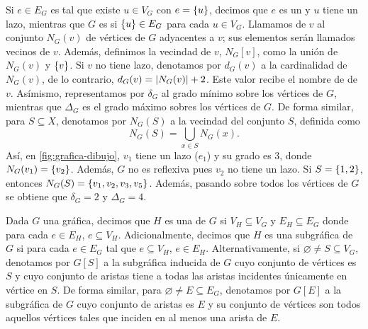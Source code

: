 Si $e\in E_G$ es tal que existe $u\in V_G$ con $e=\left\{ u\right\}$, decimos que $e$ es un
 y $u$ tiene un lazo, mientras que $G$ es
 si $\left\{ u\right\}\in E_G$ para cada $u\in V_G$.
Llamamos  de $v$ al conjunto $N_G(v)$ de v\'ertices de $G$
adyacentes a $v$; sus elementos ser\'an llamados vecinos de $v$. Adem\'as,
definimos la vecindad  de $v$, $N_G[v]$, como la
uni\'on de $N_G(v)$ y $\left\{ v\right\}$. Si $v$ no tiene lazo, denotamos por $d_G(v)$ a la
cardinalidad de $N_G(v)$, de lo contrario, $d_G(v) = \left|N_G(v)\right| + 2$. Este
valor recibe el nombre de  de $v$. As\'imismo, representamos por
$\delta_G$ al grado m\'inimo sobre los v\'ertices de $G$, mientras que
$\Delta_G$ es el grado m\'aximo sobres los v\'ertices de $G$. De forma similar,
para $S\subseteq X$, denotamos por $N_G(S)$ a la vecindad del conjunto $S$,
definida como
\[
  N_G(S) = \bigcup_{x\in S} N_G(x).
\]
As\'i, en \cref{fig:grafica-dibujo}, $v_1$ tiene un lazo ($e_1$) y su grado es
$3$, donde $N_G(v_1)=\left\{ v_2\right\}$. Adem\'as, $G$ no es reflexiva pues $v_2$ no tiene
un lazo. Si $S=\left\{ 1,2\right\}$, entonces $N_G(S)=\left\{ v_1,v_2,v_3,v_5\right\}$. Adem\'as,
pasando sobre todos los v\'ertices de $G$ se obtiene que $\delta_G=2$ y
$\Delta_G=4$.

Dada $G$ una gr\'afica, decimos que $H$ es una  de $G$ si
$V_H\subseteq V_G$ y $E_H\subseteq E_G$ donde para cada $e\in E_H$, $e\subseteq
V_H$. Adicionalmente, decimos que $H$ es una subgr\'afica
 de $G$ si para cada $e\in E_G$ tal que
$e\subseteq V_H$, $e\in E_H$. Alternativamente, si $\varnothing\neq S\subseteq
V_G$, denotamos por $G[S]$ a la subgr\'afica inducida de $G$ cuyo conjunto de
v\'ertices es $S$ y cuyo conjunto de aristas tiene a todas las aristas
incidentes \'unicamente en v\'ertice en $S$. De forma similar, para $\varnothing
\ne E \subseteq E_G$, denotamos por $G[E]$ a la subgr\'afica de $G$ cuyo
conjunto de aristas es $E$ y su conjunto de v\'ertices son todos aquellos
v\'ertices tales que inciden en al menos una arista de $E$.


